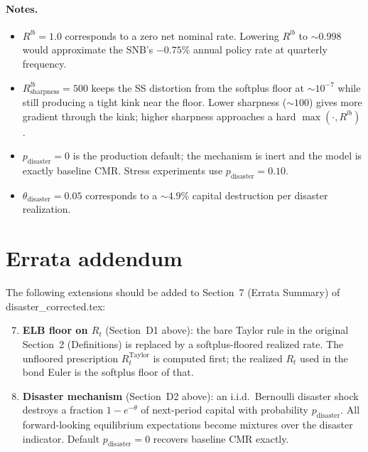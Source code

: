 \paragraph{Notes.}
\begin{itemize}
\item $R^{lb} = 1.0$ corresponds to a zero net nominal rate. Lowering
  $R^{lb}$ to $\sim 0.998$ would approximate the SNB's $-0.75\%$ annual
  policy rate at quarterly frequency.
\item $R^{lb}_{\text{sharpness}} = 500$ keeps the SS distortion from
  the softplus floor at ${\sim}10^{-7}$ while still producing a tight
  kink near the floor. Lower sharpness ($\sim 100$) gives more
  gradient through the kink; higher sharpness approaches a hard
  $\max(\cdot, R^{lb})$.
\item $p_{\text{disaster}} = 0$ is the production default; the
  mechanism is inert and the model is exactly baseline CMR. Stress
  experiments use $p_{\text{disaster}} = 0.10$.
\item $\theta_{\text{disaster}} = 0.05$ corresponds to a ${\sim}4.9\%$
  capital destruction per disaster realization.
\end{itemize}


\section*{Errata addendum}

The following extensions should be added to Section~7 (Errata Summary)
of disaster\_corrected.tex:

\begin{enumerate}
\setcounter{enumi}{6}
\item \textbf{ELB floor on $R_t$} (Section~D1 above): the bare Taylor
  rule in the original Section~2 (Definitions) is replaced by a
  softplus-floored realized rate. The unfloored prescription
  $R^{\text{Taylor}}_t$ is computed first; the realized $R_t$ used in
  the bond Euler is the softplus floor of that.
\item \textbf{Disaster mechanism} (Section~D2 above): an i.i.d.\
  Bernoulli disaster shock destroys a fraction $1 - e^{-\theta}$ of
  next-period capital with probability $p_{\text{disaster}}$. All
  forward-looking equilibrium expectations become mixtures over the
  disaster indicator. Default $p_{\text{disaster}} = 0$ recovers
  baseline CMR exactly.
\end{enumerate}
